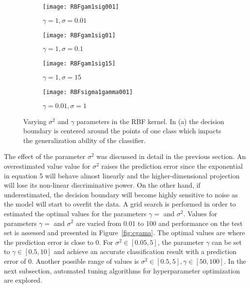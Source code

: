 \documentclass[conference,compsoc]{IEEEtran}
\begin{document}
     \begin{figure*}[]
        \begin{subfigure}{0.50\linewidth}
            \texttt{[image: RBFgam1sig001]}
            \caption{$\gamma=1, \sigma=0.01$}
        \end{subfigure}
        \begin{subfigure}{0.50\linewidth}
            \texttt{[image: RBFgam1sig01]}
            \caption{$\gamma=1, \sigma=0.1$}
        \end{subfigure}
        \begin{subfigure}{0.50\linewidth}
            \texttt{[image: RBFgam1sig15]}
            \caption{$\gamma=1, \sigma=15$}
        \end{subfigure}
           \begin{subfigure}{0.50\linewidth}
            \texttt{[image: RBFsigma1gamma001]}
            \caption{$\gamma=0.01, \sigma=1$}
        \end{subfigure}
   
        \caption{Varying $\sigma^2$ and $\gamma$ parameters in the RBF kernel. In (a) the decision boundary is centered around the points of one class which impacts the generalization ability of the classifier.  }                 
        
        \label{fig:irisrbf}
    \end{figure*}

The  effect of the parameter $\sigma^2$ was discussed in detail in the previous section. An overestimated value value for $\sigma^2$ raises the prediction error since the exponential in equation 5 will behave almost linearly and the higher-dimensional projection will lose its non-linear discriminative power. On the other hand, if underestimated, the decision boundary will become highly sensitive to noise as the model will start to overfit the data.
A grid search is performed in order to estimated the optimal values for the parameters $\gamma=$ and $\sigma^2$. Values for parameters $\gamma=$ and $\sigma^2$ are varied from 0.01 to 100 and performance on the test set is assessed and presented in Figure~\ref{fig:cgama}. The optimal values are where the prediction error is close to 0. For $\sigma^2 \in [0.05,5] $, the parameter $\gamma$ can be set to $\gamma \in [0.5,10] $ and achieve an accurate classification result with a prediction error of 0. Another possible range of values is $\sigma^2 \in [0.5,5], \gamma \in [50,100]$. In the next subsection, automated tuning algorithms for hyperparameter optimization are explored.
\end{document}
